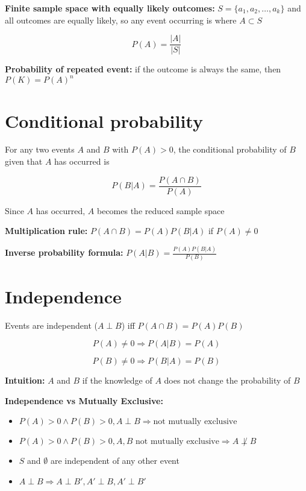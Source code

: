 \documentclass[twocolumn, 8pt]{extarticle}
\begin{document}
\textbf{Finite sample space with equally likely outcomes:} $S = \{a_1, a_2, \ldots, a_k\}$ and all outcomes are equally likely, so any event occurring is where $A \subset S$

$$
P(A) = \frac{|A|}{|S|}
$$

\textbf{Probability of repeated event:} if the outcome is always the same, then $P(K) = P(A)^n$

\section*{Conditional probability}\noindent

For any two events $A$ and $B$ with $P(A) > 0$, the conditional probability of $B$ given that $A$ has occurred is

$$
P(B|A) = \frac{P(A \cap B)}{P(A)}
$$

Since $A$ has occurred, $A$ becomes the reduced sample space

\textbf{Multiplication rule:} $P(A \cap B) = P(A)P(B|A)$ if $P(A) \neq 0$

\textbf{Inverse probability formula:} $P(A|B) = \frac{P(A)P(B|A)}{P(B)}$

\section*{Independence}\noindent

Events are independent ($A \perp B$) iff $P(A \cap B) = P(A)P(B)$

$$
P(A) \neq 0 \Rightarrow P(A|B) = P(A)
$$

$$
P(B) \neq 0 \Rightarrow P(B|A) = P(B)
$$

\textbf{Intuition:} $A$ and $B$ if the knowledge of $A$ does not change the probability of $B$

\textbf{Independence vs Mutually Exclusive:}

\begin{itemize}
    \item $P(A) > 0 \land P(B) > 0, A \perp B \Rightarrow \text{not mutually exclusive}$
    \item $P(A) > 0 \land P(B) > 0, A, B \text{ not mutually exclusive} \Rightarrow A \not\perp B$
    \item $S$ and $\emptyset$ are independent of any other event
    \item $A \perp B \Rightarrow A \perp B', A' \perp B, A' \perp B'$
\end{itemize}
\end{document}
